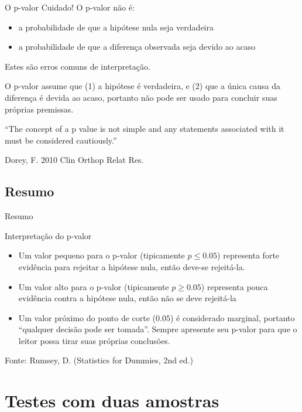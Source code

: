 \documentclass{beamer}
\begin{document}
\begin{frame}{O p-valor}
  Cuidado! O p-valor \alert{não é}:
  \begin{itemize}
  \item a probabilidade de que a hipótese nula seja verdadeira
  \item a probabilidade de que a diferença observada seja devido ao
    acaso
  \end{itemize}
  \begin{block}{}
    Estes são erros comuns de interpretação. 

    O p-valor assume que (1) a hipótese é verdadeira, e (2) que a
    única causa da diferença é devida ao acaso, portanto não pode ser
    usado para concluir suas próprias premissas.
  \end{block}
  \begin{block}{}
    ``The concept of a p value is not simple and any statements
    associated with it must be considered cautiously.''

    Dorey, F. 2010 Clin Orthop Relat Res.
  \end{block}
\end{frame}

\subsection{Resumo}

\begin{frame}{Resumo}
\begin{block}{Interpretação do p-valor}
  \begin{itemize}
  \item Um valor pequeno para o p-valor (tipicamente $p \le 0.05$)
    representa forte evidência para rejeitar a hipótese nula, então
    deve-se rejeitá-la.
  \item Um valor alto para o p-valor (tipicamente $p \ge 0.05$)
    representa pouca evidência contra a hipótese nula, então não se
    deve rejeitá-la
  \item Um valor próximo do ponto de corte ($0.05$) é considerado
    marginal, portanto ``qualquer decisão pode ser tomada''. Sempre
    apresente seu p-valor para que o leitor possa tirar suas próprias
    conclusões.
  \end{itemize}
\end{block}
Fonte: Rumsey, D. (Statistics for Dummies, 2nd ed.)
\end{frame}

\section{Testes com duas amostras}
\end{document}

